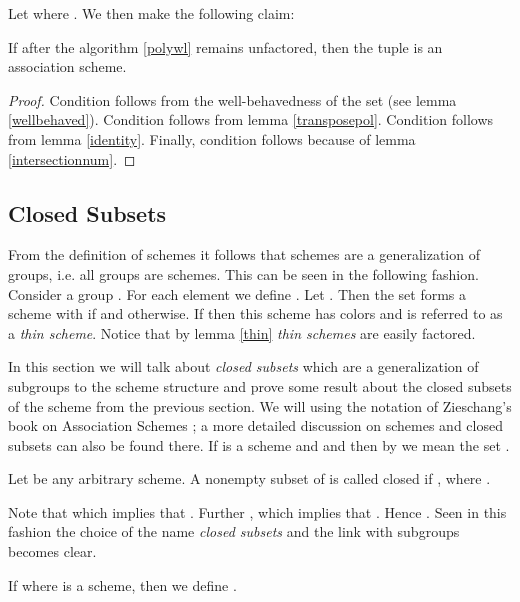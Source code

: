 	
	Let  where . We then make the following claim:
	\begin{lemma}
		If after the algorithm \ref{polywl}  remains unfactored, then the tuple  is an association scheme.
	 \end{lemma}

	\begin{proof}
		Condition  follows from the well-behavedness of the set  (see lemma \ref{wellbehaved}). Condition  follows from lemma \ref{transposepol}. Condition  follows from lemma \ref{identity}. Finally,
		condition  follows because of lemma \ref{intersectionnum}.
	\end{proof}




	\subsection{Closed Subsets}\label{sec:subset}
      From the definition of schemes it follows that schemes are a generalization of groups, i.e. all groups are schemes. This can be seen in the following fashion. Consider a group . For each element 
      we define . Let . Then the set  forms a scheme with  if  and  otherwise. If  then this scheme has  colors and is
      referred to as a \emph{thin scheme}. Notice that by lemma \ref{thin} \emph{thin schemes} are easily factored. 

      In this section we will talk about \emph{closed subsets} which are a generalization of subgroups to the scheme structure and prove some result about the closed subsets of the scheme  from the previous 
      section. We will using the notation of Zieschang's book on Association Schemes \cite{zieschang}; a more detailed discussion on schemes and closed subsets can also be found there. If  is a scheme and 
      and  then by  we mean the set .


      \begin{definition}
	      Let  be any arbitrary scheme. A nonempty subset  of  is called closed if , where .
      \end{definition}

      Note that  which implies that . Further , which implies that . Hence .	Seen in this fashion the choice of the name \emph{closed subsets}
      and the link with subgroups becomes clear. 

      \begin{definition}
	 If  where  is a scheme, then we define .
 \end{definition}


